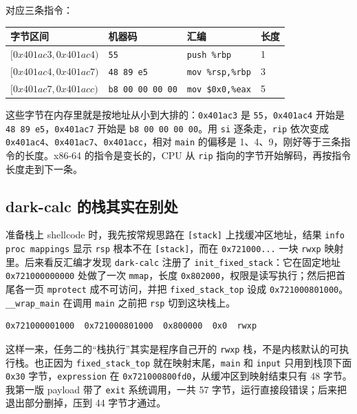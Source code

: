 \documentclass[UTF8,11pt,fontset=fandol]{ctexart}
\newcommand{\code}[1]{\texttt{#1}}
\begin{document}
对应三条指令：

\begin{center}
\begin{tabular}{@{}llll@{}}
\toprule
字节区间 & 机器码 & 汇编 & 长度\\
\midrule
$[0x401ac3,0x401ac4)$ & \code{55} & \code{push \%rbp} & 1\\
$[0x401ac4,0x401ac7)$ & \code{48 89 e5} & \code{mov \%rsp,\%rbp} & 3\\
$[0x401ac7,0x401acc)$ & \code{b8 00 00 00 00} & \code{mov \$0x0,\%eax} & 5\\
\bottomrule
\end{tabular}
\end{center}

这些字节在内存里就是按地址从小到大排的：\code{0x401ac3} 是 \code{55}，\code{0x401ac4} 开始是 \code{48 89 e5}，\code{0x401ac7} 开始是 \code{b8 00 00 00 00}。用 \code{si} 逐条走，\code{rip} 依次变成 \code{0x401ac4}、\code{0x401ac7}、\code{0x401acc}，相对 \code{main} 的偏移是 1、4、9，刚好等于三条指令的长度。x86-64 的指令是变长的，CPU 从 \code{rip} 指向的字节开始解码，再按指令长度走到下一条。

\subsection{dark-calc 的栈其实在别处}

准备栈上 shellcode 时，我先按常规思路在 \code{[stack]} 上找缓冲区地址，结果 \code{info proc mappings} 显示 \code{rsp} 根本不在 \code{[stack]}，而在 \code{0x721000...} 一块 \code{rwxp} 映射里。后来看反汇编才发现 \code{dark-calc} 注册了 \code{init\_fixed\_stack}：它在固定地址 \code{0x721000000000} 处做了一次 \code{mmap}，长度 \code{0x802000}，权限是读写执行；然后把首尾各一页 \code{mprotect} 成不可访问，并把 \code{fixed\_stack\_top} 设成 \code{0x721000801000}。\code{\_\_wrap\_main} 在调用 \code{main} 之前把 \code{rsp} 切到这块栈上。

\begin{lstlisting}
0x721000001000  0x721000801000  0x800000  0x0  rwxp
\end{lstlisting}

这样一来，任务二的“栈执行”其实是程序自己开的 \code{rwxp} 栈，不是内核默认的可执行栈。也正因为 \code{fixed\_stack\_top} 就在映射末尾，\code{main} 和 \code{input} 只用到栈顶下面 \code{0x30} 字节，\code{expression} 在 \code{0x721000800fd0}，从缓冲区到映射结束只有 48 字节。我第一版 payload 带了 \code{exit} 系统调用，一共 57 字节，运行直接段错误；后来把退出部分删掉，压到 44 字节才通过。
\end{document}

